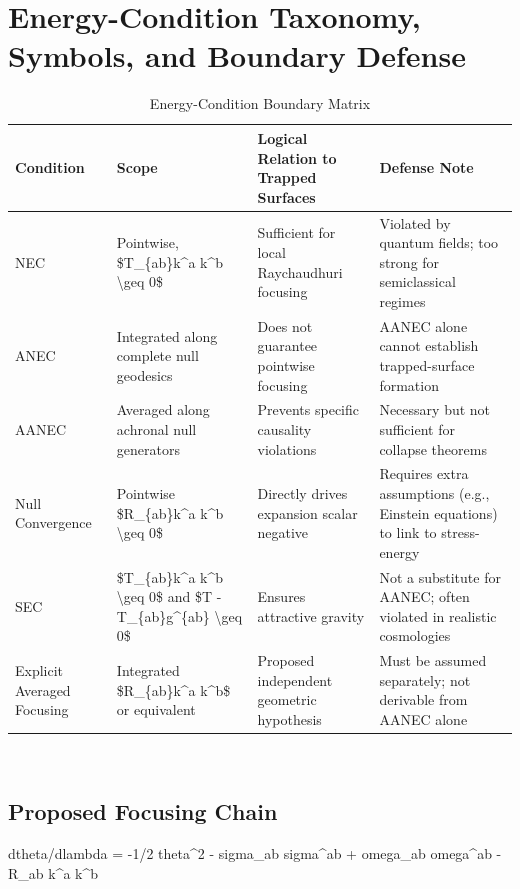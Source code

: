 \documentclass[conference]{IEEEtran}
\begin{document}
\appendices
\section{Energy-Condition Taxonomy, Symbols, and Boundary Defense}
\begin{table}[htbp]
\centering
\footnotesize
\setlength{\tabcolsep}{3pt}
\renewcommand{\arraystretch}{1.12}
\caption{Energy-Condition Boundary Matrix}
\label{tab:appendix-variables-and-definitions-block-taxonomy}
\begin{tabular}{|p{}|p{}|p{}|p{}|}
\hline
Condition & Scope & Logical Relation to Trapped Surfaces & Defense Note \\\hline
NEC & Pointwise, \$T\_\{ab\}k\textasciicircum{}a k\textasciicircum{}b \textbackslash{}geq 0\$ & Sufficient for local Raychaudhuri focusing & Violated by quantum fields; too strong for semiclassical regimes \\\hline
ANEC & Integrated along complete null geodesics & Does not guarantee pointwise focusing & AANEC alone cannot establish trapped-surface formation \\\hline
AANEC & Averaged along achronal null generators & Prevents specific causality violations & Necessary but not sufficient for collapse theorems \\\hline
Null Convergence & Pointwise \$R\_\{ab\}k\textasciicircum{}a k\textasciicircum{}b \textbackslash{}geq 0\$ & Directly drives expansion scalar negative & Requires extra assumptions (e.g., Einstein equations) to link to stress-energy \\\hline
SEC & \$T\_\{ab\}k\textasciicircum{}a k\textasciicircum{}b \textbackslash{}geq 0\$ and \$T - T\_\{ab\}g\textasciicircum{}\{ab\} \textbackslash{}geq 0\$ & Ensures attractive gravity & Not a substitute for AANEC; often violated in realistic cosmologies \\\hline
Explicit Averaged Focusing & Integrated \$R\_\{ab\}k\textasciicircum{}a k\textasciicircum{}b\$ or equivalent & Proposed independent geometric hypothesis & Must be assumed separately; not derivable from AANEC alone \\\hline
\end{tabular}
\end{table}~\cite{cite_0ed84243cf171bc4}

\subsection{Proposed Focusing Chain}
dtheta/dlambda = -1/2 theta\textasciicircum{}2 - sigma\_ab sigma\textasciicircum{}ab + omega\_ab omega\textasciicircum{}ab - R\_ab k\textasciicircum{}a k\textasciicircum{}b
\end{document}
